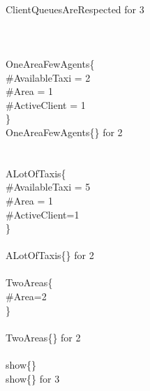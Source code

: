	\qquad \\
	 ClientQueuesAreRespected {\color{blue}for} 3\\
	\qquad \\
	\\
	\qquad \\
	 OneAreaFewAgents\{\\
	\qquad \-\qquad \#AvailableTaxi = 2\\
	\qquad \-\qquad \#Area = 1\\
	\qquad \-\qquad \#ActiveClient = 1\\
	\qquad \}\\
	 OneAreaFewAgents\{\} {\color{blue}for} 2 \qquad \\
	\qquad \\
	\qquad \\
	 ALotOfTaxis\{\\
	\qquad \-\qquad \#AvailableTaxi = 5\\
	\qquad \-\qquad \#Area = 1\\
	\qquad \-\qquad \#ActiveClient=1\\
	\qquad \}\\
	\qquad \\
	 ALotOfTaxis\{\} {\color{blue}for} 2 \qquad \\
	\qquad \\
	 TwoAreas\{\\
	\qquad \-\qquad \#Area=2\\
	\qquad \}\\
	\qquad \\
	 TwoAreas\{\} {\color{blue}for} 2\\
	\qquad \\
	 show\{\}\\
	 show\{\} {\color{blue}for} 3\\
